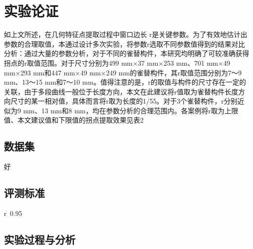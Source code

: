\section{实验论证}
如上文所述，在几何特征点提取过程中窗口边长
r是关键参数。为了有效地估计出参数的合理取值，本通过设计多次实验，将参数r选取不同参数值得到的结果对比分析：通过大量的参数分析，对于不同的雀替构件，本研究均明确了可较准确获得拐点的r取值范围。对于尺寸分别为499 mm×37 mm×253 mm、701 mm×49 mm×293 mm和447 mm×49 mm×249 mm的雀替构件，其r取值范围分别为7～9 mm、13～15 mm和7～10 mm。值得注意的是，r的取值与构件的尺寸存在一定的关联，由于多段曲线一般位于长度方向，本文在此建议将r值取为雀替构件长度方向尺寸的某一相对值，具体而言将r取为长度的1/55。对于3个雀替构件，r分别近似为9 mm、13 mm和8 mm，均在参数分析的合理范围内。各案例将r取为上限值、本文建议值和下限值的拐点提取效果见表2\cite{1012391475.nh,WOS:000979996300004}

\subsection{数据集}
好
\subsection{评测标准}

r~0.95

\subsection{实验过程与分析}
